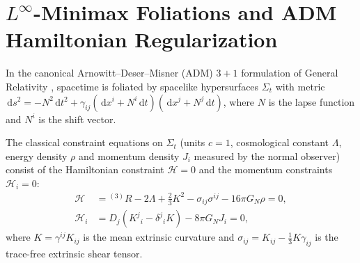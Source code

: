 \documentclass[11pt,a4paper,reqno]{amsart}
\theoremstyle{definition}
\numberwithin{equation}{section}
\newcommand{\dif}{\,\mathrm{d}}
\begin{document}
\section{\texorpdfstring{$L^\infty$}{L-infinity}-Minimax Foliations and ADM Hamiltonian Regularization}
\label{sec:minimax_adm}

In the canonical Arnowitt--Deser--Misner (ADM) $3+1$ formulation of General Relativity \cite{arnowitt1962dynamics, dirac1964lectures, dewitt1967quantum}, spacetime is foliated by spacelike hypersurfaces $\Sigma_t$ with metric $\dif s^2 = -N^2 \dif t^2 + \gamma_{ij}(\dif x^i + N^i \dif t)(\dif x^j + N^j \dif t)$, where $N$ is the lapse function and $N^i$ is the shift vector.

The classical constraint equations on $\Sigma_t$ (units $c = 1$, cosmological constant $\Lambda$, energy density $\rho$ and momentum density $J_i$ measured by the normal observer) consist of the Hamiltonian constraint $\mathcal{H} = 0$ and the momentum constraints $\mathcal{H}_i = 0$:
\begin{align}
    \label{eq:wdw_constraint}
    \mathcal{H} &= {}^{(3)}R - 2\Lambda + \frac{2}{3}K^2 - \sigma_{ij}\sigma^{ij} - 16\pi G_N \rho = 0, \\
    \label{eq:momentum_constraint}
    \mathcal{H}_i &= D_j \left( K^j{}_i - \delta^j{}_i K \right) - 8\pi G_N J_i = 0,
\end{align}
where $K = \gamma^{ij} K_{ij}$ is the mean extrinsic curvature and $\sigma_{ij} = K_{ij} - \frac{1}{3} K \gamma_{ij}$ is the trace-free extrinsic shear tensor.
\end{document}
